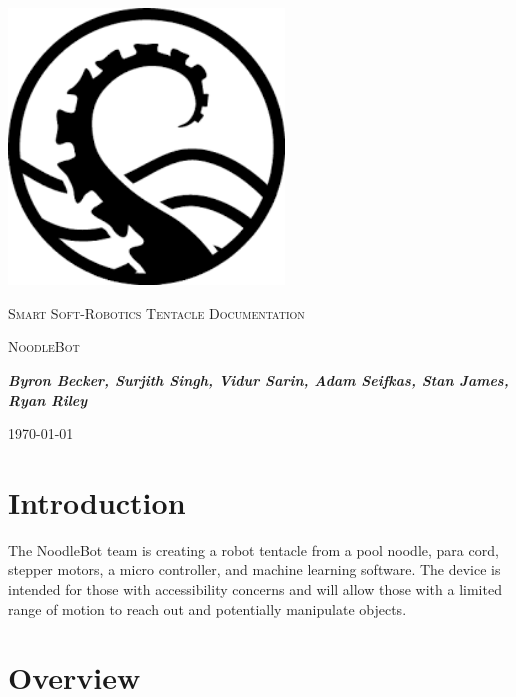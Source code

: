 \documentclass[12pt,a4paper]{article}
\begin{document}
\begin{titlepage}
	\centering
	\includegraphics[width=0.55\textwidth]{tentacle.png}\par\vspace{1cm}
	{\scshape\LARGE Smart Soft-Robotics Tentacle Documentation\par}
	\vspace{1cm}
	{\scshape\Large NoodleBot\par}
	\vspace{1.5cm}
	{\itshape \textbf{Byron Becker, Surjith Singh, Vidur Sarin, Adam Seifkas, Stan James, Ryan Riley}\par}
	{\large \today\par}
\end{titlepage}

\tableofcontents

\newpage
\section{Introduction}

The NoodleBot team is creating a robot tentacle from a pool noodle, para cord, stepper motors, a micro controller, and machine learning software. The device is intended for those with accessibility concerns and will allow those with a limited range of motion to reach out and potentially manipulate objects.

\section{Overview}
\end{document}
